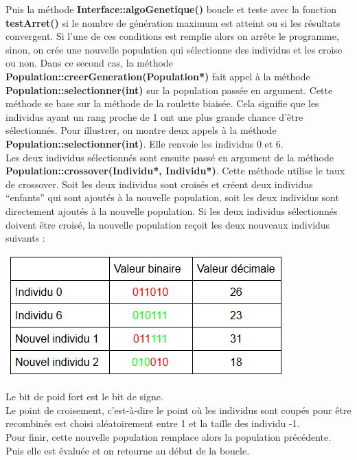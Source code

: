 \documentclass[a4paper,11pt]{article}
\begin{document}
			Puis la méthode \textbf{Interface::algoGenetique()} boucle et teste avec la fonction \textbf{testArret()} si le nombre de génération maximum est atteint ou si les résultats convergent.
			Si l’une de ces conditions est remplie alors on arrête le programme, sinon, on crée une nouvelle population qui sélectionne des individus et les croise ou non.
			Dans ce second cas, la méthode \textbf{Population::creerGeneration(Population*)} fait appel à la méthode \textbf{Population::selectionner(int)} sur la population passée en argument.
			Cette méthode se base sur la méthode de la roulette biaisée.
			Cela signifie que les individus ayant un rang proche de 1 ont une plus grande chance d’être sélectionnés.
			Pour illustrer, on montre deux appels à la méthode \textbf{Population::selectionner(int)}. Elle renvoie les individus 0 et 6.\\

			Les deux individus sélectionnés sont ensuite passé en argument de la méthode \textbf{Population::crossover(Individu*, Individu*)}.
			Cette méthode utilise le taux de crossover.
			Soit les deux individus sont croisés et créent deux individus “enfants” qui sont ajoutés à la nouvelle population, soit les deux individus sont directement ajoutés à la nouvelle population.
			Si les deux individus sélectionnés doivent être croisé, la nouvelle population reçoit les deux nouveaux individus suivants :\\
			\centerline{\includegraphics[scale=0.5]{Crossover.png}}
			Le bit de poid fort est le bit de signe.\\
			Le point de croisement, c’est-à-dire le point où les individus sont coupés pour être recombinés est choisi aléatoirement entre 1 et la taille des individu -1.\\
			
			Pour finir, cette nouvelle population remplace alors la population précédente. Puis elle est évaluée et on retourne au début de la boucle.\\
			
\end{document}
